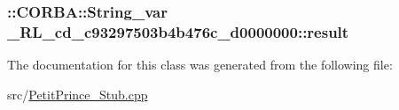 \subsubsection[{\texorpdfstring{result}{result}}]{\setlength{\rightskip}{0pt plus 5cm}\+::C\+O\+R\+B\+A\+::\+String\+\_\+var \+\_\+R\+L\+\_\+cd\+\_\+c93297503b4b476c\+\_\+d0000000\+::result}\hypertarget{class__0_r_l__cd__c93297503b4b476c__d0000000_a85333e8615ac624f1ed70841d68adc3a}{}\label{class__0_r_l__cd__c93297503b4b476c__d0000000_a85333e8615ac624f1ed70841d68adc3a}


The documentation for this class was generated from the following file\+:\begin{DoxyCompactItemize}
\item 
src/\hyperlink{_petit_prince___stub_8cpp}{Petit\+Prince\+\_\+\+Stub.\+cpp}\end{DoxyCompactItemize}
